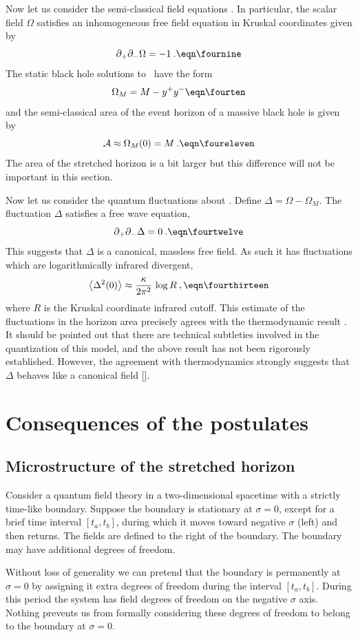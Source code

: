 Now let us consider the semi-classical field equations \sceomone .
In particular, the scalar field $\Omega$ satisfies an inhomogeneous
free field equation in Kruskal coordinates given by
$$
\pa_+ \pa_- \Omega = -1 \>.
\eqn\fournine
$$
The static black hole solutions to \fournine\ have the form
$$
\Omega_M = M - \yp \ym
\eqn\fourten
$$
and the semi-classical area of the event horizon of a massive black
hole is given by
$$
{\cal A} \approx \Omega_M(0) = M \>.
\eqn\foureleven
$$
The area of the stretched horizon is a bit larger but this difference
will not be important in this section.

Now let us consider the quantum fluctuations about \fourten .  Define
$\Delta = \Omega - \Omega_M$.  The fluctuation $\Delta$ satisfies a
free wave equation,
$$
\pa_+ \pa_- \Delta = 0 \>.
\eqn\fourtwelve
$$
This suggests that $\Delta$ is a canonical, massless free field.  As
such it has fluctuations which are logarithmically infrared
divergent,
$$
\bigl\langle \Delta^2(0) \bigr\rangle
\approx {\kappa \over 2\pi^2} \, \log R \>,
\eqn\fourthirteen
$$
where $R$ is the Kruskal coordinate infrared cutoff.  This estimate
of the fluctuations in the horizon area precisely agrees with the
thermodynamic result \fourseven .  It should be pointed out that
there are technical subtleties involved in the quantization of this
model, and the above result has not been rigorously established.
However, the agreement with thermodynamics strongly suggests that
$\Delta$ behaves like a canonical field [\ssstt].

%
%
\chapter{Consequences of the postulates}

\section{Microstructure of the stretched horizon}

Consider a quantum field theory in a two-dimensional spacetime with a
strictly time-like boundary.  Suppose the boundary is stationary at
$\sigma = 0$, except for a brief time interval $[t_a, t_b]$, during
which it moves toward negative $\sigma$ (left) and then returns.  The
fields are defined to the right of the boundary.  The boundary may
have additional degrees of freedom.

Without loss of generality we can pretend that the boundary is
permanently at $\sigma = 0$ by assigning it extra degrees of freedom
during the interval $[t_a, t_b]$.  During this period the system has
field degrees of freedom on the negative $\sigma$ axis.  Nothing
prevents us from formally considering these degrees of freedom to
belong to the boundary at $\sigma=0$.


